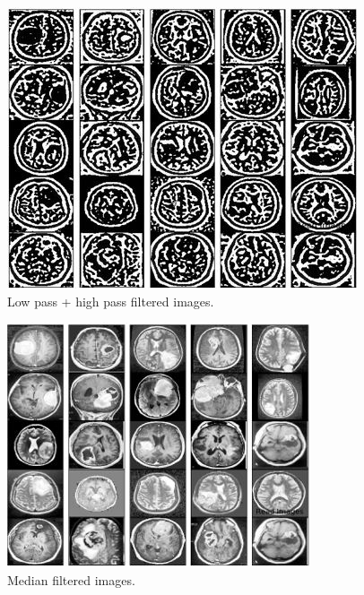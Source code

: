 \documentclass[conference]{IEEEtran}
\begin{document}
\begin{figure}[h]
\centering
\includegraphics[scale=0.43]{figures/lpf_hpf.JPG}
\caption{Low pass + high pass filtered images.}
\end{figure}
\begin{figure}[h]
\centering
\includegraphics[scale=0.43]{figures/median.JPG}
\caption{Median filtered images.}
\end{figure}
\end{document}
